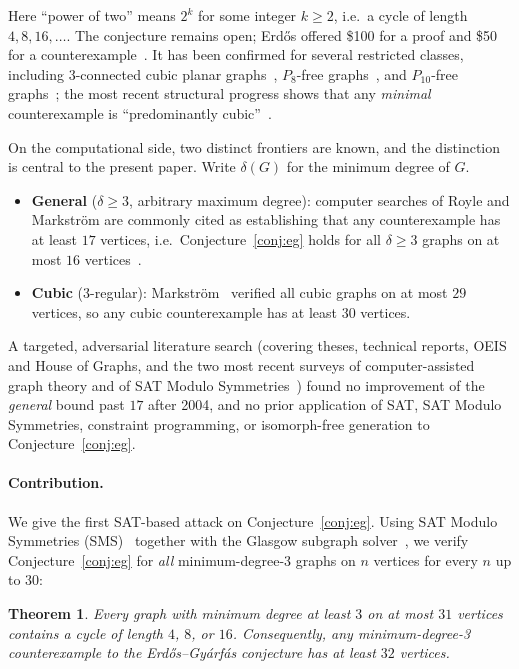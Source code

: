 \documentclass[11pt]{article}
\newtheorem{theorem}{Theorem}
\newcommand{\degmin}{\delta}
\begin{document}
Here ``power of two'' means $2^k$ for some integer $k \ge 2$, i.e.\ a cycle of
length $4, 8, 16, \dots$. The conjecture remains open; Erd\H{o}s offered \$100 for
a proof and \$50 for a counterexample~\cite{erdos-problems}. It has been confirmed
for several restricted classes, including 3-connected cubic planar
graphs~\cite{heckman-krakovski}, $P_8$-free graphs~\cite{gao-shan}, and $P_{10}$-free
graphs~\cite{hu-shen}; the most recent structural progress shows that any
\emph{minimal} counterexample is ``predominantly cubic''~\cite{carr2026}.

On the computational side, two distinct frontiers are known, and the distinction
is central to the present paper. Write $\degmin(G)$ for the minimum degree of $G$.
\begin{itemize}
  \item \textbf{General} ($\degmin \ge 3$, arbitrary maximum degree): computer
  searches of Royle and Markstr\"om are commonly cited as establishing that any
  counterexample has at least $17$ vertices, i.e.\ Conjecture~\ref{conj:eg} holds
  for all $\degmin\ge 3$ graphs on at most $16$ vertices~\cite{wikipedia-eg}.
  \item \textbf{Cubic} (3-regular): Markstr\"om~\cite{markstrom2004} verified all
  cubic graphs on at most $29$ vertices, so any cubic counterexample has at least
  $30$ vertices.
\end{itemize}
A targeted, adversarial literature search (covering theses, technical reports,
OEIS and House of Graphs, and the two most recent surveys of computer-assisted
graph theory and of SAT Modulo Symmetries~\cite{szeider-survey,jooken-survey})
found no improvement of the \emph{general} bound past $17$ after 2004, and no prior
application of SAT, SAT Modulo Symmetries, constraint programming, or isomorph-free
generation to Conjecture~\ref{conj:eg}.

\paragraph{Contribution.}
We give the first SAT-based attack on Conjecture~\ref{conj:eg}. Using SAT Modulo
Symmetries (SMS)~\cite{sms-tocl,szeider-survey} together with the Glasgow subgraph
solver~\cite{glasgow}, we verify Conjecture~\ref{conj:eg} for \emph{all}
minimum-degree-3 graphs on $n$ vertices for every $n$ up to $30$:

\begin{theorem}
\label{thm:main}
Every graph with minimum degree at least $3$ on at most $31$ vertices contains a
cycle of length $4$, $8$, or $16$. Consequently, any minimum-degree-3
counterexample to the Erd\H{o}s--Gy\'arf\'as conjecture has at least $32$ vertices.
\end{theorem}
\end{document}
